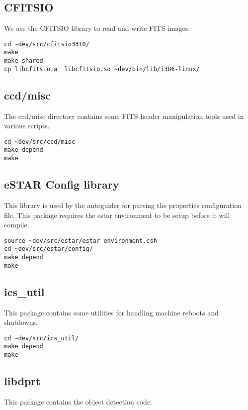 \documentclass[10pt,a4paper]{article}
\begin{document}
\subsection{CFITSIO}

We use the CFITSIO library to read and write FITS images.

\begin{verbatim}
cd ~dev/src/cfitsio3310/
make
make shared
cp libcfitsio.a  libcfitsio.so ~dev/bin/lib/i386-linux/
\end{verbatim}

\subsection{ccd/misc}

The ccd/misc directory contains some FITS header manipulation tools used in various scripts.

\begin{verbatim}
cd ~dev/src/ccd/misc
make depend
make
\end{verbatim}

\subsection{eSTAR Config library}

This library is used by the autoguider for parsing the properties configuration file. This package requires the estar environment to be setup before it will compile.

\begin{verbatim}
source ~dev/src/estar/estar_environment.csh
cd ~dev/src/estar/config/
make depend
make
\end{verbatim}

\subsection{ics\_util}

This package contains some utilities for handling machine reboots and shutdowns.

\begin{verbatim}
cd ~dev/src/ics_util/
make depend
make
\end{verbatim}

\subsection{libdprt}

This package contains the object detection code.
\end{document}

